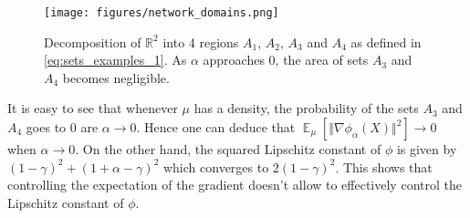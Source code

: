 \documentclass{article}
\DeclareMathOperator{\E}{\mathbb E}
\newcommand{\R}{\mathbb R}
\begin{document}
\begin{figure}[ht]
\centering
        \texttt{[image: figures/network\_domains.png]}
            \caption{Decomposition of $\R^2$ into 4 regions $A_1$, $A_2$, $A_3$ and $A_4$ as defined in \cref{eq:sets_examples_1}. As $\alpha$ approaches $0$, the area of sets $A_3$ and $A_4$ becomes negligible.}
    \label{fig:example_1_domains}
\end{figure}


It is easy to see that whenever $\mu$ has a density, the probability of the sets $A_3$ and $A_4$ goes to $0$ are $\alpha \rightarrow 0$. Hence one can deduce that $\E_{\mu}[\Vert \nabla \phi_{\alpha}(X)\Vert^2] \rightarrow  0$ when $\alpha \rightarrow 0$. On the other hand, the squared Lipschitz constant of $\phi$ is given by $(1-\gamma)^2 + (1+\alpha -\gamma)^2 $ which converges to $2(1-\gamma)^2$. This shows that controlling the expectation of the gradient doesn't allow to effectively control the Lipschitz constant of $\phi$.
\end{document}
